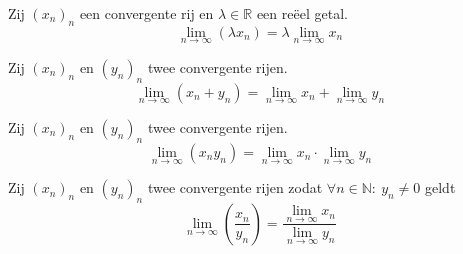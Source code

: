 \documentclass[main.tex]{subfiles}
\begin{document}
\begin{st}
  Zij $(x_{n})_{n}$ een convergente rij en $\lambda\in \mathbb{R}$ een re\"eel getal.
  \[ \lim_{n \rightarrow \infty}(\lambda x_{n}) = \lambda \lim_{n\rightarrow \infty}x_{n} \]
\end{st}

\begin{st}
  Zij $(x_{n})_{n}$ en $(y_{n})_{n}$ twee convergente rijen.
  \[ \lim_{n \rightarrow \infty}(x_{n}+y_{n}) = \lim_{n\rightarrow \infty}x_{n} + \lim_{n\rightarrow \infty}y_{n} \]
\end{st}

\begin{st}
  Zij $(x_{n})_{n}$ en $(y_{n})_{n}$ twee convergente rijen.
  \[ \lim_{n \rightarrow \infty}(x_{n}y_{n}) = \lim_{n\rightarrow \infty}x_{n} \cdot \lim_{n\rightarrow \infty}y_{n} \]
\end{st}

\begin{st}
  Zij $(x_{n})_{n}$ en $(y_{n})_{n}$ twee convergente rijen zodat $\forall n\in \mathbb{N}:\ y_{n}\neq 0$ geldt
  \[ \lim_{n \rightarrow \infty}\left(\frac{x_{n}}{y_{n}}\right) = \frac{\lim_{n\rightarrow \infty}x_{n}}{\lim_{n\rightarrow \infty}y_{n}} \]
\end{st}
\end{document}

